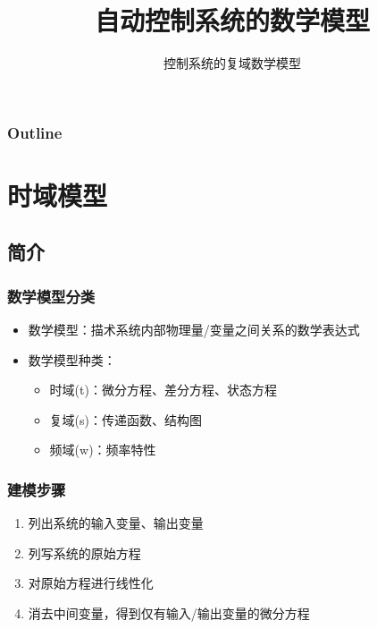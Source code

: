 \documentclass{article}
\subtitle{控制系统的复域数学模型}
\title{自动控制系统的数学模型}
\author{}
\date{}
\begin{document}
\maketitle

\begin{frame}
\frametitle{Outline}
\setcounter{tocdepth}{3}
\tableofcontents
\end{frame}












\section{时域模型}
\label{sec-1}
\subsection{简介}
\label{sec-1-1}
\begin{frame}
\frametitle{数学模型分类}
\label{sec-1-1-1}

\begin{itemize}
\item <2->数学模型：描术系统内部物理量/变量之间关系的数学表达式
\item <3->数学模型种类：
\begin{itemize}
\item <4->时域(t)：微分方程、差分方程、状态方程
\item <5->复域(s)：传递函数、结构图
\item <6->频域(w)：频率特性
\end{itemize}
\end{itemize}
\end{frame}
\begin{frame}
\frametitle{建模步骤}
\label{sec-1-1-2}

\begin{enumerate}
\item <2->列出系统的输入变量、输出变量
\item <3->列写系统的原始方程
\item <4->对原始方程进行线性化
\item <5->消去中间变量，得到仅有输入/输出变量的微分方程
\end{enumerate}
\end{frame}
\end{document}

